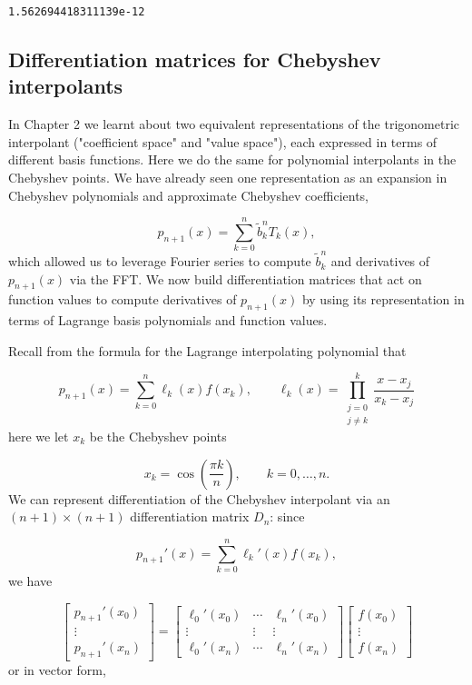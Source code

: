 \documentclass[12pt,a4paper]{article}
\begin{document}
\begin{lstlisting}
1.562694418311139e-12
\end{lstlisting}


\subsection{Differentiation matrices for Chebyshev interpolants}
In Chapter 2 we learnt about two equivalent representations of the trigonometric interpolant ("coefficient space" and "value space"), each expressed in terms of different basis functions.  Here we do the same for polynomial interpolants in the Chebyshev points. We have already seen one representation as an expansion in Chebyshev polynomials and approximate Chebyshev coefficients,

\[
p_{n+1}(x) = \sum_{k = 0}^{n}\tilde{b}_k^n T_k(x),
\]
which allowed us to leverage Fourier series to compute $\tilde{b}_k^n$ and derivatives of $p_{n+1}(x)$ via the FFT.  We now build differentiation matrices that act on function values to compute derivatives of $p_{n+1}(x)$ by using its representation in terms of Lagrange basis polynomials and function values.

Recall from the formula for the Lagrange interpolating polynomial that

\[
p_{n+1}(x) = \sum_{k = 0}^{n}\ell_k(x)f(x_k), \qquad \ell_k(x) = \prod_{\substack{j=0\\ j \neq k}}^{k}\frac{x-x_j}{x_k-x_j}
\]
here we let $x_k$ be the Chebyshev points 

\[
x_k = \cos\left(\frac{\pi k}{n} \right), \qquad k = 0, \ldots, n.
\]
We can represent differentiation of the Chebyshev interpolant via an $(n+1) \times (n+1)$ differentiation matrix $D_n$: since

\[
p_{n+1}'(x) = \sum_{k = 0}^{n}\ell_k'(x)f(x_k),
\]
we have

\[
\begin{bmatrix}
p_{n+1}'(x_0) \\
\vdots \\
p_{n+1}'(x_n)
\end{bmatrix} = 
\begin{bmatrix}
\ell_0'(x_0) & \cdots & \ell_n'(x_0) \\
\vdots & \vdots  & \vdots \\
\ell_0'(x_n) & \cdots & \ell_n'(x_n)
\end{bmatrix}
\begin{bmatrix}
f(x_0) \\
\vdots \\
f(x_n)
\end{bmatrix}
\]
or in vector form,
\end{document}
